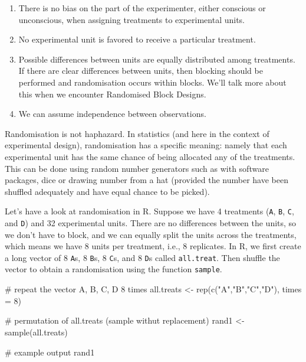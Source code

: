 \documentclass[
  letterpaper,
]{book}
\newenvironment{Shaded}{\begin{snugshade}}{\end{snugshade}}
\newcommand{\AttributeTok}[1]{\textcolor[rgb]{0.40,0.45,0.13}{#1}}
\newcommand{\CommentTok}[1]{\textcolor[rgb]{0.37,0.37,0.37}{#1}}
\newcommand{\DecValTok}[1]{\textcolor[rgb]{0.68,0.00,0.00}{#1}}
\newcommand{\FunctionTok}[1]{\textcolor[rgb]{0.28,0.35,0.67}{#1}}
\newcommand{\NormalTok}[1]{\textcolor[rgb]{0.00,0.23,0.31}{#1}}
\newcommand{\OtherTok}[1]{\textcolor[rgb]{0.00,0.23,0.31}{#1}}
\newcommand{\StringTok}[1]{\textcolor[rgb]{0.13,0.47,0.30}{#1}}
\begin{document}
\begin{enumerate}
\def\labelenumi{\arabic{enumi}.}
\item
  There is no bias on the part of the experimenter, either conscious or
  unconscious, when assigning treatments to experimental units.
\item
  No experimental unit is favored to receive a particular treatment.
\item
  Possible differences between units are equally distributed among
  treatments. If there are clear differences between units, then
  blocking should be performed and randomisation occurs within blocks.
  We'll talk more about this when we encounter Randomised Block Designs.
\item
  We can assume independence between observations.
\end{enumerate}

Randomisation is not haphazard. In statistics (and here in the context
of experimental design), randomisation has a specific meaning: namely
that each experimental unit has the same chance of being allocated any
of the treatments. This can be done using random number generators such
as with software packages, dice or drawing number from a hat (provided
the number have been shuffled adequately and have equal chance to be
picked).

Let's have a look at randomisation in R. Suppose we have 4 treatments
(\texttt{A}, \texttt{B}, \texttt{C}, and \texttt{D}) and 32 experimental
units. There are no differences between the units, so we don't have to
block, and we can equally split the units across the treatments, which
means we have 8 units per treatment, i.e., 8 replicates. In R, we first
create a long vector of 8 \texttt{A}s, 8 \texttt{B}s, 8 \texttt{C}s, and
8 \texttt{D}s called \texttt{all.treat}. Then shuffle the vector to
obtain a randomisation using the function \texttt{sample}.

\begin{Shaded}
\begin{Highlighting}[]
\CommentTok{\# repeat the vector A, B, C, D 8 times }
\NormalTok{all.treats }\OtherTok{\textless{}{-}} \FunctionTok{rep}\NormalTok{(}\FunctionTok{c}\NormalTok{(}\StringTok{"A"}\NormalTok{,}\StringTok{"B"}\NormalTok{,}\StringTok{"C"}\NormalTok{,}\StringTok{"D"}\NormalTok{), }\AttributeTok{times =} \DecValTok{8}\NormalTok{)}

\CommentTok{\# permutation of all.treats (sample withut replacement)}
\NormalTok{rand1 }\OtherTok{\textless{}{-}} \FunctionTok{sample}\NormalTok{(all.treats)}

\CommentTok{\# example output}
\NormalTok{rand1}
\end{Highlighting}
\end{Shaded}
\end{document}
